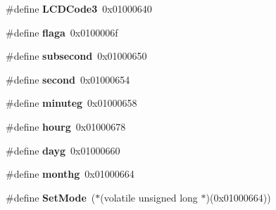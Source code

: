 \begin{DoxyCompactItemize}
\#define {\bfseries L\+C\+D\+Code3}~0x01000640
\item 
\mbox{\label{a00017_a7ef4ab11dcfd29d3883045081f7ceaa9}} 
\#define {\bfseries flaga}~0x0100006f
\item 
\mbox{\label{a00017_a81cdf7492bd03dd6526dd3808283039c}} 
\#define {\bfseries subsecond}~0x01000650
\item 
\mbox{\label{a00017_abc2d9013938c4fcdc5beeac9af26ea57}} 
\#define {\bfseries second}~0x01000654
\item 
\mbox{\label{a00017_a1ae1e452465d6d5e7956d025a0c58fc7}} 
\#define {\bfseries minuteg}~0x01000658
\item 
\mbox{\label{a00017_a7ddf2f22375dcadda0c720c6946dde76}} 
\#define {\bfseries hourg}~0x01000678
\item 
\mbox{\label{a00017_a1e69b7c99eee653dc9de64a52a588066}} 
\#define {\bfseries dayg}~0x01000660
\item 
\mbox{\label{a00017_a17d21720d847cc096e0c0f9ce0755bd4}} 
\#define {\bfseries monthg}~0x01000664
\item 
\mbox{\label{a00017_a853261722f6a38804e9fe7ff43f83261}} 
\#define {\bfseries Set\+Mode}~($\ast$(volatile unsigned long $\ast$)(0x01000664))
\end{DoxyCompactItemize}
